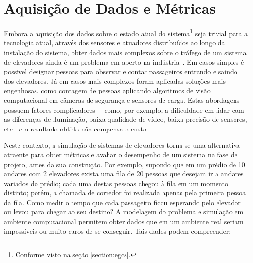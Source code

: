 \section{\label{section:data}Aquisição de Dados e Métricas}

Embora a aquisição dos dados sobre o estado atual do sistema\footnote{Conforme
visto na seção \ref{section:egcs}.} seja trivial para a tecnologia atual,
através dos sensores e atuadores distribuídos ao longo da instalação do sistema,
obter dados mais complexos sobre o tráfego de um sistema de elevadores ainda é
um problema em aberto na indústria~\cite{KOEHLEROTTIGER02}. Em casos simples é
possível designar pessoas para observar e contar passageiros entrando e saindo
dos elevadores. Já em casos mais complexos foram aplicadas soluções mais
engenhosas, como contagem de pessoas aplicando algoritmos de visão computacional
em câmeras de segurança e sensores de carga. Estas abordagens possuem fatores
complicadores~-~como, por exemplo, a dificuldade em lidar com as diferenças de
iluminação, baixa qualidade de vídeo, baixa precisão de sensores, etc - e o
resultado obtido não compensa o custo~\cite{KOEHLEROTTIGER02}.

Neste contexto, a simulação de sistemas de elevadores torna-se uma alternativa
atraente para obter métricas e avaliar o desempenho de um sistema na fase de
projeto, antes da sua construção. Por exemplo, supondo que em um prédio de 10
andares com 2 elevadores exista uma fila de 20 pessoas que desejam ir a andares
variados do prédio; cada uma destas pessoas chegou à fila em um momento
distinto; porém, a chamada de corredor foi realizada apenas pela primeira pessoa
da fila. Como medir o tempo que cada passageiro ficou esperando pelo elevador ou
levou para chegar ao seu destino? A modelagem do problema e simulação em
ambiente computacional permitem obter dados que em um ambiente real seriam
impossíveis ou muito caros de se conseguir. Tais dados podem compreender:


